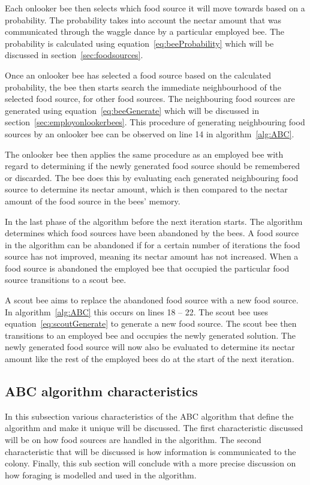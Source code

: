 Each onlooker bee then selects which food source it will move towards based on a probability. The probability takes into account the nectar amount that was communicated through the waggle dance by a particular employed bee. The probability is calculated using equation~\ref{eq:beeProbability} which will be discussed in section~\ref{sec:foodsources}.

Once an onlooker bee has selected a food source based on the calculated probability, the bee then starts search the immediate neighbourhood of the selected food source, for other food sources. The neighbouring food sources are generated using equation~\ref{eq:beeGenerate} which will be discussed in section~\ref{sec:employonlookerbees}. This procedure of generating neighbouring food sources by an onlooker bee can be observed on line 14 in algorithm~\ref{alg:ABC}.

The onlooker bee then applies the same procedure as an employed bee with regard to determining if the newly generated food source should be remembered or discarded. The bee does this by evaluating each generated neighbouring food source to determine its nectar amount, which is then compared to the nectar amount of the food source in the bees' memory.

In the last phase of the algorithm before the next iteration starts. The algorithm determines which food sources have been abandoned by the bees. A food source in the algorithm can be abandoned if for a certain number of iterations the food source has not improved, meaning its nectar amount has not increased. When a food source is abandoned the employed bee that occupied the particular food source transitions to a scout bee.

A scout bee aims to replace the abandoned food source with a new food source. In algorithm~\ref{alg:ABC} this occurs on lines 18 -- 22. The scout bee uses equation~\ref{eq:scoutGenerate} to generate a new food source. The scout bee then transitions to an employed bee and occupies the newly generated solution. The newly generated food source will now also be evaluated to determine its nectar amount like the rest of the employed bees do at the start of the next iteration.

\subsection{ABC algorithm characteristics}
In this subsection various characteristics of the ABC algorithm that define the algorithm and make it unique will be discussed. The first characteristic discussed will be on how food sources are handled in the algorithm. The second characteristic that will be discussed is how information is communicated to the colony. Finally, this sub section will conclude with a more precise discussion on how foraging is modelled and used in the algorithm.
